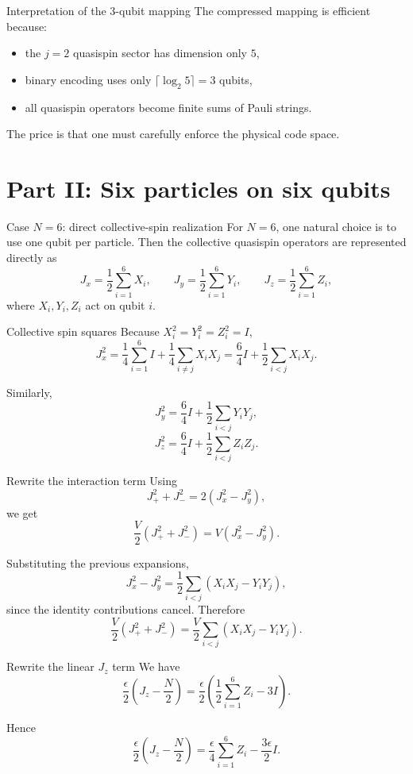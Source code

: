 \documentclass[aspectratio=169]{beamer}
\begin{document}
\begin{frame}{Interpretation of the 3-qubit mapping}
The compressed mapping is efficient because:
\begin{itemize}
\item the \(j=2\) quasispin sector has dimension only \(5\),
\item binary encoding uses only \(\lceil \log_2 5\rceil = 3\) qubits,
\item all quasispin operators become finite sums of Pauli strings.
\end{itemize}

The price is that one must carefully enforce the physical code space.
\end{frame}

\section{Part II: Six particles on six qubits}

\begin{frame}{Case \(N=6\): direct collective-spin realization}
For \(N=6\), one natural choice is to use one qubit per particle.
Then the collective quasispin operators are represented directly as
\[
J_x = \frac{1}{2}\sum_{i=1}^{6} X_i,
\qquad
J_y = \frac{1}{2}\sum_{i=1}^{6} Y_i,
\qquad
J_z = \frac{1}{2}\sum_{i=1}^{6} Z_i,
\]
where \(X_i,Y_i,Z_i\) act on qubit \(i\).
\end{frame}

\begin{frame}{Collective spin squares}
Because \(X_i^2=Y_i^2=Z_i^2=I\),
\[
J_x^2
=
\frac{1}{4}\sum_{i=1}^{6} I
+
\frac{1}{4}\sum_{i\neq j} X_iX_j
=
\frac{6}{4}I + \frac{1}{2}\sum_{i<j} X_iX_j.
\]

Similarly,
\[
J_y^2
=
\frac{6}{4}I + \frac{1}{2}\sum_{i<j} Y_iY_j,
\]
\[
J_z^2
=
\frac{6}{4}I + \frac{1}{2}\sum_{i<j} Z_iZ_j.
\]
\end{frame}

\begin{frame}{Rewrite the interaction term}
Using
\[
J_+^2+J_-^2 = 2(J_x^2-J_y^2),
\]
we get
\[
\frac{V}{2}(J_+^2+J_-^2)
=
V(J_x^2-J_y^2).
\]

Substituting the previous expansions,
\[
J_x^2-J_y^2
=
\frac{1}{2}\sum_{i<j}\left(X_iX_j-Y_iY_j\right),
\]
since the identity contributions cancel.
Therefore
\[
\frac{V}{2}(J_+^2+J_-^2)
=
\frac{V}{2}\sum_{i<j}\left(X_iX_j-Y_iY_j\right).
\]
\end{frame}

\begin{frame}{Rewrite the linear \(J_z\) term}
We have
\[
\frac{\epsilon}{2}\left(J_z-\frac{N}{2}\right)
=
\frac{\epsilon}{2}\left(\frac{1}{2}\sum_{i=1}^{6} Z_i - 3I\right).
\]

Hence
\[
\frac{\epsilon}{2}\left(J_z-\frac{N}{2}\right)
=
\frac{\epsilon}{4}\sum_{i=1}^{6} Z_i
-
\frac{3\epsilon}{2}I.
\]
\end{frame}
\end{document}

